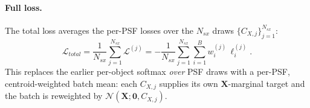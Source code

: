 \paragraph{Full loss.}
The total loss averages the per-PSF losses over the $N_{sx}$ draws
$\{C_{X,j}\}_{j=1}^{N_{sx}}$:
\begin{equation}
  \boxed{
  \mathcal{L}_{total}
  = \frac{1}{N_{sx}}\sum_{j=1}^{N_{sx}}\mathcal{L}^{(j)}
  = -\frac{1}{N_{sx}}\sum_{j=1}^{N_{sx}}\sum_{i=1}^{B}
    w_i^{(j)}\,\ell_i^{(j)}.
  }
  \label{eq:loss}
\end{equation}
This replaces the earlier per-object softmax \emph{over} PSF draws with a
per-PSF, centroid-weighted batch mean: each $C_{X,j}$ supplies its own
$\mathbf{X}$-marginal target and the batch is reweighted by
$\mathcal{N}(\mathbf{X};\mathbf{0},C_{X,j})$.
